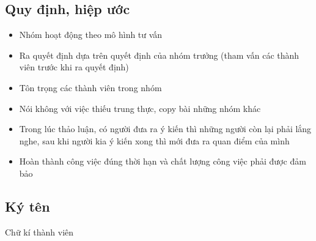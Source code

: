 \documentclass[13pt,a4paper]{article}
\begin{document}
\subsection{Quy định, hiệp ước}
\vspace{0.25cm}

\begin{itemize}
    \item Nhóm hoạt động theo mô hình tư vấn
    \item Ra quyết định dựa trên quyết định của nhóm trưởng (tham vấn các thành viên trước khi ra quyết định)
    \item Tôn trọng các thành viên trong nhóm
    \item Nói không với việc thiếu trung thực, copy bài những nhóm khác
    \item Trong lúc thảo luận, có người đưa ra ý kiến thì những người còn lại phải lắng nghe, sau khi người kia ý kiến xong thì mới đưa ra quan điểm của mình
    \item Hoàn thành công việc đúng thời hạn và chất lượng công việc phải được đảm bảo
\end{itemize}
\vspace{1 cm}
\newpage
\subsection{Ký tên} 

Chữ kí thành viên \\
\end{document}
